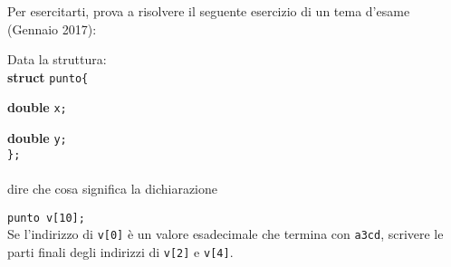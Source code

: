 Per esercitarti, prova a risolvere il seguente esercizio di un tema d'esame (Gennaio 2017): 
\begin{shaded}
Data la struttura:\\

\textbf{struct} \verb|punto{|
    
\qquad\textbf{double} \verb|x;|

\qquad\textbf{double} \verb|y;|\\
\verb|};|\\ \\
dire che cosa significa la dichiarazione

\qquad\verb|punto v[10];|\\

Se l'indirizzo di \verb|v[0]| è un valore esadecimale che termina con \verb|a3cd|, scrivere le parti finali degli indirizzi di \verb|v[2]| e \verb|v[4]|.
\end{shaded}
